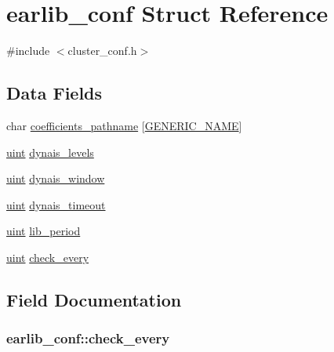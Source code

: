 \hypertarget{structearlib__conf}{}\section{earlib\+\_\+conf Struct Reference}
\label{structearlib__conf}


{\ttfamily \#include $<$cluster\+\_\+conf.\+h$>$}

\subsection*{Data Fields}
\begin{DoxyCompactItemize}
\item 
char \hyperlink{structearlib__conf_a7d50f565148d113852156a44fd99edbd}{coefficients\+\_\+pathname} \mbox{[}\hyperlink{loop_8h_a6b0b8b14cfc75447be8feba3efe18da8}{G\+E\+N\+E\+R\+I\+C\+\_\+\+N\+A\+ME}\mbox{]}
\item 
\hyperlink{generic_8h_a91ad9478d81a7aaf2593e8d9c3d06a14}{uint} \hyperlink{structearlib__conf_a8b5712014dc86a9a08936c75b9449689}{dynais\+\_\+levels}
\item 
\hyperlink{generic_8h_a91ad9478d81a7aaf2593e8d9c3d06a14}{uint} \hyperlink{structearlib__conf_a66bb2fa87356ed7b10a7cde1fbf915f4}{dynais\+\_\+window}
\item 
\hyperlink{generic_8h_a91ad9478d81a7aaf2593e8d9c3d06a14}{uint} \hyperlink{structearlib__conf_a2d78a9744ace1d5f246239c5ce30e62b}{dynais\+\_\+timeout}
\item 
\hyperlink{generic_8h_a91ad9478d81a7aaf2593e8d9c3d06a14}{uint} \hyperlink{structearlib__conf_ad046e8531b8e16e3d9bbd713d220441d}{lib\+\_\+period}
\item 
\hyperlink{generic_8h_a91ad9478d81a7aaf2593e8d9c3d06a14}{uint} \hyperlink{structearlib__conf_a01a7a7fd34fc93e41185f242232e678b}{check\+\_\+every}
\end{DoxyCompactItemize}


\subsection{Field Documentation}
\subsubsection[{\texorpdfstring{check\+\_\+every}{check_every}}]{ earlib\+\_\+conf\+::check\+\_\+every}\hypertarget{structearlib__conf_a01a7a7fd34fc93e41185f242232e678b}{}\label{structearlib__conf_a01a7a7fd34fc93e41185f242232e678b}
